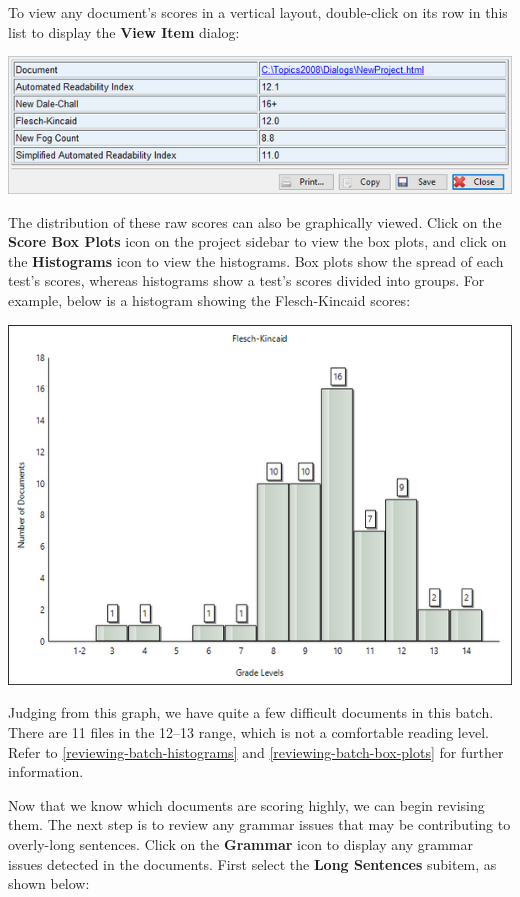 \documentclass[
]{book}
\theoremstyle{definition}
\theoremstyle{definition}
\theoremstyle{definition}
\theoremstyle{definition}
\theoremstyle{remark}
\begin{document}
To view any document's scores in a vertical layout, double-click on its row in this list to display the \textbf{View Item} dialog:

\begin{center}\includegraphics[width=0.75\linewidth,]{Images/viewitemrawscores} \end{center}

The distribution of these raw scores can also be graphically viewed. Click on the \textbf{Score Box Plots} icon on the project sidebar to view the box plots, and click on the \textbf{Histograms} icon to view the histograms. Box plots show the spread of each test's scores, whereas histograms show a test's scores divided into groups. For example, below is a histogram showing the Flesch-Kincaid scores:

\begin{center}\includegraphics[width=0.75\linewidth,]{Images/histogrades} \end{center}

Judging from this graph, we have quite a few difficult documents in this batch. There are 11 files in the 12--13 range, which is not a comfortable reading level. Refer to \ref{reviewing-batch-histograms} and \ref{reviewing-batch-box-plots} for further information.

Now that we know which documents are scoring highly, we can begin revising them. The next step is to review any grammar issues that may be contributing to overly-long sentences. Click on the \textbf{Grammar} icon to display any grammar issues detected in the documents. First select the \textbf{Long Sentences} subitem, as shown below:
\end{document}
